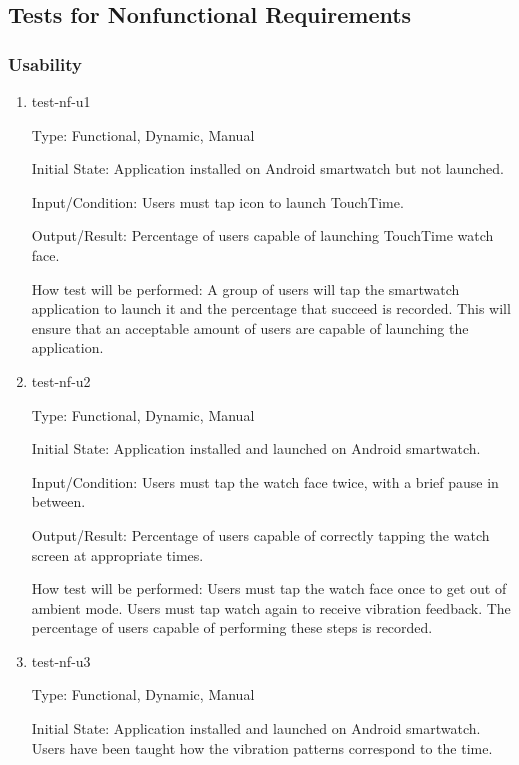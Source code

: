 \subsection{Tests for Nonfunctional Requirements}

\subsubsection{Usability}

\begin{enumerate}

\item{test-nf-u1\\}

Type: Functional, Dynamic, Manual
					
Initial State: Application installed on Android smartwatch but not launched.
					
Input/Condition: Users must tap icon to launch TouchTime.
					
Output/Result: Percentage of users capable of launching TouchTime watch face.
					
How test will be performed: A group of users will tap the smartwatch application to launch it and the percentage that succeed is recorded. This will ensure that an acceptable amount of users are capable of launching the application.
					
\item{test-nf-u2\\}

Type: Functional, Dynamic, Manual
					
Initial State: Application installed and launched on Android smartwatch. 
					
Input/Condition: Users must tap the watch face twice, with a brief pause in between.
					
Output/Result: Percentage of users capable of correctly tapping the watch screen at appropriate times.
					
How test will be performed: Users must tap the watch face once to get out of ambient mode. Users must tap watch again to receive vibration feedback. The percentage of users capable of performing these steps is recorded. 

\item{test-nf-u3\\}

Type: Functional, Dynamic, Manual
					
Initial State: Application installed and launched on Android smartwatch. Users have been taught how the vibration patterns correspond to the time.
					

\end{enumerate}
